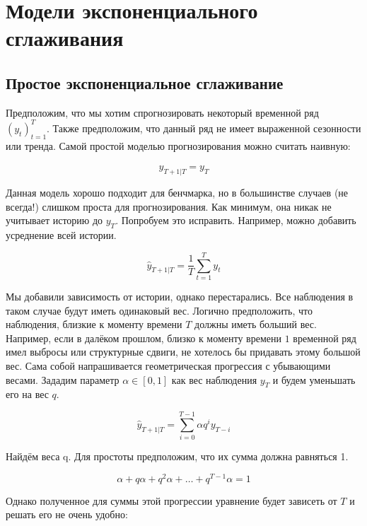 \documentclass[12pt,fleqn]{article}
\begin{document}
\section{Модели экспоненциального сглаживания}

\subsection{Простое экспоненциальное сглаживание}

Предположим, что мы хотим спрогнозировать некоторый временной ряд $(y_t)_{t=1}^{T}$. Также предположим, что данный ряд не имеет выраженной сезонности или тренда. Самой простой моделью прогнозирования можно считать наивную:

\begin{equation}
\hat{y}_{T+1|T} = y_T
\end{equation}

Данная модель хорошо подходит для бенчмарка, но в большинстве случаев (не всегда!) слишком проста для прогнозирования. Как минимум, она никак не учитывает историю до $y_T$. Попробуем это исправить. Например, можно добавить усреднение всей истории.


\begin{equation}
\hat{y}_{T+1|T} = \frac{1}{T}\sum_{t=1}^{T}y_t
\end{equation}

Мы добавили зависимость от истории, однако перестарались. Все наблюдения в таком случае будут иметь одинаковый вес. Логично предположить, что наблюдения, близкие к моменту времени $T$ должны иметь больший вес. Например, если в далёком прошлом, близко к моменту времени $1$ временной ряд имел выбросы или структурные сдвиги, не хотелось бы придавать этому большой вес. Сама собой напрашивается геометрическая прогрессия с убывающими весами. Зададим параметр $\alpha \in [0, 1]$ как вес наблюдения $y_T$ и будем уменьшать его на вес $q$.

\begin{equation}
\hat{y}_{T+1|T} =\sum_{i=0}^{T-1} \alpha q^{i} y_{T-i}
\end{equation}

Найдём веса q. Для простоты предположим, что их сумма должна равняться 1. 

\begin{equation}
\alpha + q \alpha + q^2 \alpha + \ldots + q^{T-1} \alpha = 1
\end{equation}

Однако полученное для суммы этой прогрессии уравнение будет  зависеть от $T$ и решать его не очень удобно:
\end{document}
